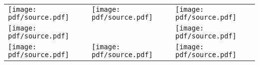 \documentclass{standalone}
\newcommand{\A}{\texttt{[image: pdf/source.pdf]}}
\begin{document}
\begin{center}
\begin{tabular}{lll}
\A & \A & \A\\
\A &    & \A\\
\A & \A & \A
\end{tabular}
\end{center}
\end{document}
